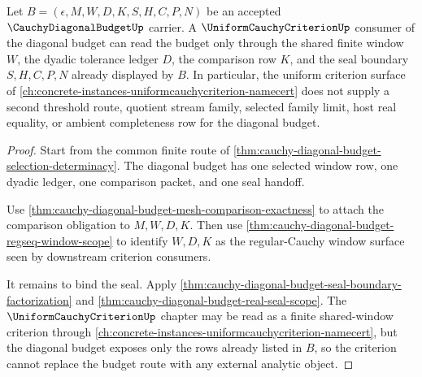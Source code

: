 \begin{theorem}
\label{thm:cauchy-diagonal-budget-uniform-criterion-budget-route}
Let $B=(\epsilon,M,W,D,K,S,H,C,P,N)$ be an accepted $\CauchyDiagonalBudgetUp$ carrier. A $\UniformCauchyCriterionUp$ consumer of the diagonal budget can read the budget only through the shared finite window $W$, the dyadic tolerance ledger $D$, the comparison row $K$, and the seal boundary $S,H,C,P,N$ already displayed by $B$. In particular, the uniform criterion surface of \autoref{ch:concrete-instances-uniformcauchycriterion-namecert} does not supply a second threshold route, quotient stream family, selected family limit, host real equality, or ambient completeness row for the diagonal budget.
\end{theorem}
\begin{proof}
Start from the common finite route of \autoref{thm:cauchy-diagonal-budget-selection-determinacy}. The diagonal budget has one selected window row, one dyadic ledger, one comparison packet, and one seal handoff.

Use \autoref{thm:cauchy-diagonal-budget-mesh-comparison-exactness} to attach the comparison obligation to $M,W,D,K$. Then use \autoref{thm:cauchy-diagonal-budget-regseq-window-scope} to identify $W,D,K$ as the regular-Cauchy window surface seen by downstream criterion consumers.

It remains to bind the seal. Apply \autoref{thm:cauchy-diagonal-budget-seal-boundary-factorization} and \autoref{thm:cauchy-diagonal-budget-real-seal-scope}. The $\UniformCauchyCriterionUp$ chapter may be read as a finite shared-window criterion through \autoref{ch:concrete-instances-uniformcauchycriterion-namecert}, but the diagonal budget exposes only the rows already listed in $B$, so the criterion cannot replace the budget route with any external analytic object.
\end{proof}

